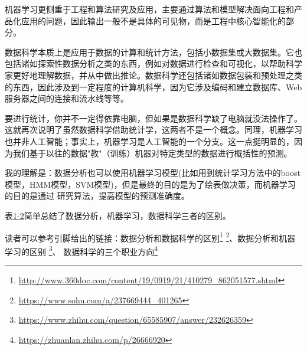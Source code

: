机器学习更侧重于工程和算法研究及应用，主要通过算法和模型解决面向工程和产品化应用的问题，因此输出一般不是具体的可见物，而是工程中核心智能化的部分。

数据科学本质上是应用于数据的计算和统计方法，包括小数据集或大数据集。它也包括诸如探索性数据分析之类的东西，例如对数据进行检查和可视化，以帮助科学家更好地理解数据，并从中做出推论。数据科学还包括诸如数据包装和预处理之类的东西，因此涉及到一定程度的计算机科学，因为它涉及编码和建立数据库、Web服务器之间的连接和流水线等等。

要进行统计，你并不一定得依靠电脑，但如果是数据科学缺了电脑就没法操作了。这就再次说明了虽然数据科学借助统计学，这两者不是一个概念。同理，机器学习也并非人工智能；事实上，机器学习是人工智能的一个分支。这一点挺明显的，因为我们基于以往的数据"教"（训练）机器对特定类型的数据进行概括性的预测。

我的理解是：数据分析也可以使用机器学习模型(比如用到统计学习方法中的boost模型，HMM模型，SVM模型)，但是最终的目的是为了绘表做决策，而机器学习的目的是通过 研究算法，提高模型的预测准确度。

表\href{table:1-2}{1-2}简单总结了数据分析，机器学习，数据科学三者的区别。

\begin{table}[!hpb]
\centering
\caption{数据分析，机器学习，数据科学三者的区别}
\label{table:1-2}
\end{table}

读者可以参考引脚给出的链接：数据分析和数据科学的区别\footnote{\url{http://www.360doc.com/content/19/0919/21/410279_862051577.shtml}} \footnote{\url{https://www.sohu.com/a/237669444_401265}}、数据分析和机器学习的区别
\footnote{\url{https://www.zhihu.com/question/65585907/answer/232626359}}、 数据科学的三个职业方向\footnote{\url{https://zhuanlan.zhihu.com/p/26666920}}

